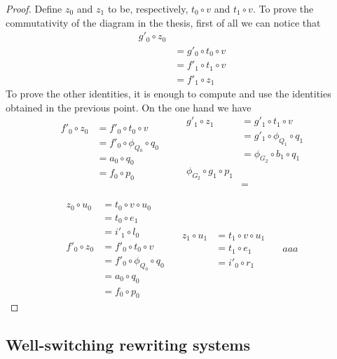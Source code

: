 \begin{proof}
	Define $z_0$ and $z_1$ to be, respectively, $t_0\circ v$ and $t_1\circ v$. To prove the commutativity of the diagram in the thesis, first of all we can notice that
	\begin{align*}
		g'_0\circ z_0\\&= g'_0\circ t_0\circ v\\&=f'_1\circ t_1\circ v\\&=f'_1\circ z_1
	\end{align*}
	To prove the other identities, it is enough to compute and use the identities obtained in the previous point. On the one hand we have
	\[	\begin{split}f'_0\circ z_0&=f'_0\circ t_0\circ v\\&=f'_0\circ \phi_{Q_0}\circ q_0\\&=a_0\circ q_0\\&=f_0\circ p_0 
	\end{split} \qquad \begin{split}
		g'_1\circ z_1&=g'_1\circ t_1\circ v\\&=g'_1\circ \phi_{Q_1}\circ q_1\\&=\phi_{G_2}\circ b_1\circ q_1\\\phi_{G_2}\circ g_1\circ p_1\\&=
	\end{split}\]
	
	\[\begin{split}
		z_0\circ u_0&= t_0\circ v \circ u_0\\&=t_0\circ e_1\\&=i'_1\circ l_0\\ 	f'_0\circ z_0&=f'_0\circ t_0\circ v\\&=f'_0\circ \phi_{Q_0}\circ q_0\\&=a_0\circ q_0\\&=f_0\circ p_0
	\end{split}\quad \begin{split}
		z_1\circ u_1&=t_1\circ v\circ u_1\\&=t_1\circ e_1\\&=i'_0\circ r_1
	\end{split} \quad \begin{split}
	aaa	
	\end{split}\]
	
\end{proof}






\subsection{Well-switching rewriting systems}

